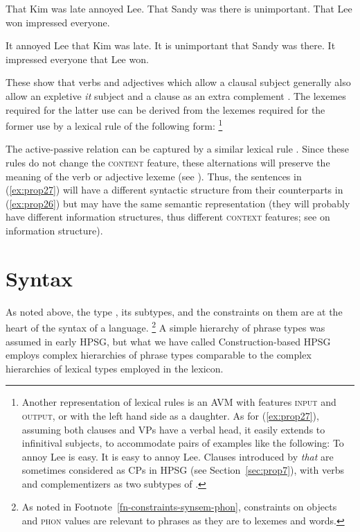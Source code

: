 \documentclass[output=paper
	        ,collection
	        ,collectionchapter
 	        ,biblatex
                ,babelshorthands
                ,newtxmath
                ,draftmode
                ,colorlinks, citecolor=brown
]{langscibook}
\begin{document}
\eal\label{ex:prop26}
\ex That Kim was late annoyed Lee.
\ex That Sandy was there is unimportant. 
\ex That Lee won impressed everyone.
\zl
	
\eal\label{ex:prop27}
\ex It annoyed Lee that Kim was late.
\ex It is unimportant that Sandy was there. 
\ex It impressed everyone that Lee won.
\zl

\noindent
These show that verbs and adjectives which allow a clausal subject generally also allow an expletive \emph{it} subject and a clause as an extra complement \citep[150]{ps2}. The lexemes required for the latter use can be derived from the lexemes required for the former use by a lexical rule of the following form:%
%
\footnote{Another representation of lexical rules is an AVM with features \textsc{input} and \textsc{output}, or with the left hand side as a daughter. As for (\ref{ex:prop27}), assuming both clauses and VPs have a verbal head, it easily extends to infinitival subjects, to accommodate pairs of examples like the following:
	\eal
        \ex To annoy Lee is easy.
	\ex It is easy to annoy Lee.
	\zl
Clauses introduced by \emph{that} are sometimes considered as CPs in HPSG (see Section~\ref{sec:prop7}), with verbs and complementizers as two subtypes of .
}
%

\ea\label{ex:prop28}
\avmtmp{[arg-st & < S > \+ \2] $\mapsto$
	[arg-st & < NP![\type{it}]! > \+ \2 \+ < S >]}
\z

\noindent
The active-passive relation can be captured by a similar lexical rule
\citep[Section~5.1.1]{Flickinger87}. Since these rules do not change the \textsc{content} feature,
these alternations will preserve the meaning of the verb or adjective lexeme (see
). Thus, the sentences in (\ref{ex:prop27}) will have a different
syntactic structure from their counterparts in (\ref{ex:prop26}) but may have the same semantic
representation (they will probably have different information structures, thus different
\textsc{context} features; see  on information structure).


\section{Syntax}\label{sec:prop5}
\label{prop:sec-syntax}

As noted above, the type , its subtypes, and the constraints on them are at the heart of the syntax of a language.%
%
\footnote{As noted in Footnote~\ref{fn-constraints-synsem-phon}, constraints on  objects and \textsc{phon} values are relevant to phrases as they are to lexemes and words.}
%
A simple hierarchy of phrase types was assumed in early HPSG, but what we have called Construction-based HPSG employs complex hierarchies of phrase types comparable to the complex hierarchies of lexical types employed in the lexicon.
\end{document}
